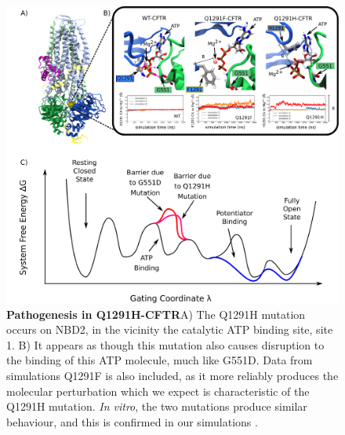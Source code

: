 \begin{figure}
	\begin{center}
		\includegraphics[width=\textwidth]{figures/perspective/Q1291.pdf}
	\end{center}
	\captionsetup{singlelinecheck = false, justification=raggedright}
	\caption[Pathogenesis in Q1291H-CFTR]{\textbf{Pathogenesis in Q1291H-CFTR}{A) The Q1291H mutation occurs on NBD2, in the vicinity the catalytic ATP binding site, site 1. B) It appears as though this mutation also causes disruption to the binding of this ATP molecule, much like G551D. Data from simulations Q1291F is also included, as it more reliably produces the molecular perturbation which we expect is characteristic of the Q1291H mutation. \textit{In vitro}, the two mutations produce similar behaviour, and this is confirmed in our simulations \cite{dong2015}. }}

	\label{Q1291H_results}

\end{figure}




